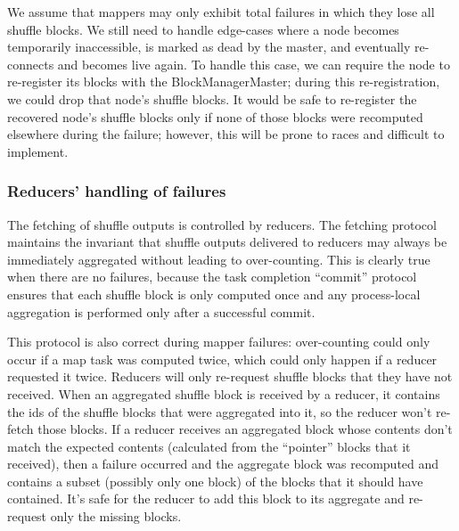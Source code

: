 \documentclass[12pt]{article}
\begin{document}
We assume that mappers may only exhibit total failures in which they lose all
shuffle blocks.  We still need to handle edge-cases where a node becomes
temporarily inaccessible, is marked as dead by the master, and eventually
re-connects and becomes live again.  To handle this case, we can require the
node to re-register its blocks with the BlockManagerMaster; during this
re-registration, we could drop that node's shuffle blocks.  It would be safe
to re-register the recovered node's shuffle blocks only if none of those
blocks were recomputed elsewhere during the failure; however, this will be
prone to races and difficult to implement.

\subsubsection{Reducers' handling of failures}

The fetching of shuffle outputs is controlled by reducers.  The fetching
protocol maintains the invariant that shuffle outputs delivered to reducers
may always be immediately aggregated without leading to over-counting.  This
is clearly true when there are no failures, because the task completion
``commit'' protocol ensures that each shuffle block is only computed once and
any process-local aggregation is performed only after a successful commit.

This protocol is also correct during mapper failures: over-counting could only
occur if a map task was computed twice, which could only happen if a reducer
requested it twice.  Reducers will only re-request shuffle blocks that they
have not received.  When an aggregated shuffle block is received by a reducer,
it contains the ids of the shuffle blocks that were aggregated into it, so the
reducer won't re-fetch those blocks.  If a reducer receives an aggregated
block whose contents don't match the expected contents (calculated from the
``pointer'' blocks that it received), then a failure occurred and the
aggregate block was recomputed and contains a subset (possibly only one block)
of the blocks that it should have contained.  It's safe for the reducer
to add this block to its aggregate and re-request only the missing blocks.






\end{document}
